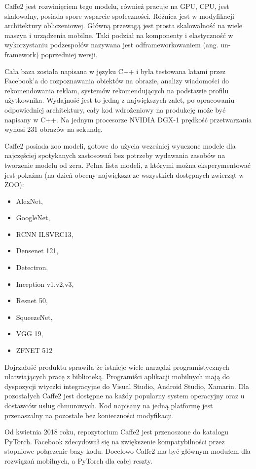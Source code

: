 \documentclass[12pt,a4paper,twoside,titlepage,openright]{book}
\begin{document}
Caffe2 jest rozwinięciem tego modelu, również pracuje na GPU, CPU, jest skalowalny, posiada spore wsparcie społeczności. Różnica jest w modyfikacji architektury obliczeniowej. Główną przewagą jest prosta skalowalność na wiele maszyn i urządzenia mobilne. Taki podział na komponenty i elastyczność w wykorzystaniu podzespołów nazywana jest odframeworkowaniem (ang. un-framework) poprzedniej wersji.
\cite{DBLP:journals/corr/JiaSDKLGGD14}

Cała baza została napisana w języku C++ i była testowana latami przez Facebook'a do rozpoznawania obiektów na obrazie, analizy wiadomości do rekomendowania reklam, systemów rekomendujących na podstawie profilu użytkownika. Wydajność jest to jedną z największych zalet, po opracowaniu odpowiedniej architektury, cały kod wdrożeniowy na produkcję może być napisany w C++. Na jednym procesorze NVIDIA DGX-1 prędkość przetwarzania wynosi 231 obrazów na sekundę. \cite{siteNvidiaCaffe2}

Caffe2 posiada zoo modeli, gotowe do użycia wcześniej wyuczone modele dla najczęściej spotykanych zastosowań bez potrzeby wydawania zasobów na tworzenie modelu od zera. Pełna lista modeli, z którymi można eksperymentować jest pokaźna (na dzień obecny największa ze wszystkich dostępnych zwierząt w ZOO):
\begin{itemize}
\item AlexNet,
\item GoogleNet,
\item RCNN ILSVRC13,
\item Densenet 121,
\item Detectron,
\item Inception v1,v2,v3,
\item Resnet 50,
\item SqueezeNet,
\item VGG 19,
\item ZFNET 512
\end{itemize}

Dojrzałość produktu sprawiła że istnieje wiele narzędzi programistycznych ułatwiających pracę z biblioteką. Programiści aplikacji mobilnych mają do dyspozycji wtyczki integracyjne do Visual Studio, Android Studio, Xamarin. Dla pozostałych Caffe2 jest dostępne na każdy popularny system operacyjny oraz u dostawców usług chmurowych. Kod napisany na jedną platformę jest przenaszalny na pozostałe bez konieczności modyfikacji.

Od kwietnia 2018 roku, repozytorium Caffe2 jest przenoszone do katalogu PyTorch. Facebook zdecydował się na zwiększenie kompatybilności przez stopniowe połączenie bazy kodu. Docelowo Caffe2 ma być głównym modułem dla rozwiązań mobilnych, a PyTorch dla całej reszty.
\end{document}
